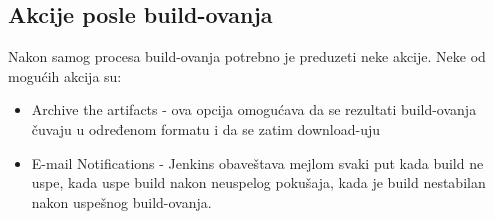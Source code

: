 \subsection{Akcije posle build-ovanja}

Nakon samog procesa build-ovanja potrebno je preduzeti neke akcije. Neke od mogućih akcija su:
\begin{itemize}
\item Archive the artifacts - ova opcija omogućava da se rezultati build-ovanja čuvaju u određenom formatu i da se zatim download-uju
\item E-mail Notifications - Jenkins obaveštava mejlom svaki put kada build ne uspe, kada uspe build nakon neuspelog pokušaja, kada je build nestabilan nakon uspešnog build-ovanja.
\end{itemize}

